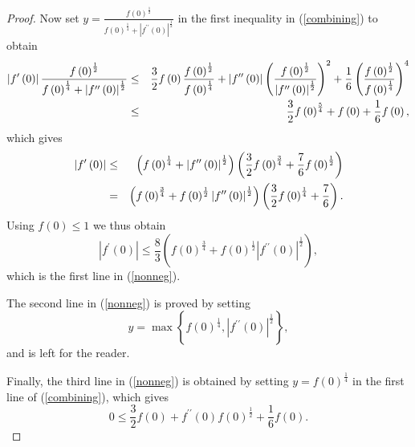 \documentclass{amsart}
\theoremstyle{plain}
\numberwithin{equation}{section}
\begin{document}
\begin{proof}
Now set $y=\frac{f\left( 0\right) ^{\frac{1}{2}}}{f\left( 0\right) ^{\frac{1%
}{4}}+\left\vert f^{\prime \prime }\left( 0\right) \right\vert ^{\frac{1}{2}}%
}$ in the first inequality in (\ref{combining}) to obtain%
\begin{eqnarray*}
\left\vert f^{\prime }\left( 0\right) \right\vert \frac{f\left( 0\right) ^{%
\frac{1}{2}}}{f\left( 0\right) ^{\frac{1}{4}}+\left\vert f^{\prime \prime
}\left( 0\right) \right\vert ^{\frac{1}{2}}} &\leq &\frac{3}{2}f\left(
0\right) \frac{f\left( 0\right) ^{\frac{1}{2}}}{f\left( 0\right) ^{\frac{1}{4%
}}}+\left\vert f^{\prime \prime }\left( 0\right) \right\vert \left( \frac{%
f\left( 0\right) ^{\frac{1}{2}}}{\left\vert f^{\prime \prime }\left(
0\right) \right\vert ^{\frac{1}{2}}}\right) ^{2}+\frac{1}{6}\left( \frac{%
f\left( 0\right) ^{\frac{1}{2}}}{f\left( 0\right) ^{\frac{1}{4}}}\right) ^{4}
\\
&\leq &\frac{3}{2}f\left( 0\right) ^{\frac{5}{4}}+f\left( 0\right) +\frac{1}{%
6}f\left( 0\right) ,
\end{eqnarray*}%
which gives%
\begin{eqnarray*}
\left\vert f^{\prime }\left( 0\right) \right\vert &\leq &\left( f\left(
0\right) ^{\frac{1}{4}}+\left\vert f^{\prime \prime }\left( 0\right)
\right\vert ^{\frac{1}{2}}\right) \left( \frac{3}{2}f\left( 0\right) ^{\frac{%
3}{4}}+\frac{7}{6}f\left( 0\right) ^{\frac{1}{2}}\right) \\
&=&\left( f\left( 0\right) ^{\frac{3}{4}}+f\left( 0\right) ^{\frac{1}{2}%
}\left\vert f^{\prime \prime }\left( 0\right) \right\vert ^{\frac{1}{2}%
}\right) \left( \frac{3}{2}f\left( 0\right) ^{\frac{1}{4}}+\frac{7}{6}%
\right) .
\end{eqnarray*}%
Using $f\left( 0\right) \leq 1$ we thus obtain 
\begin{equation*}
\left\vert f^{\prime }\left( 0\right) \right\vert \leq \frac{8}{3}\left(
f\left( 0\right) ^{\frac{3}{4}}+f\left( 0\right) ^{\frac{1}{2}}\left\vert
f^{\prime \prime }\left( 0\right) \right\vert ^{\frac{1}{2}}\right) ,
\end{equation*}%
which is the first line in (\ref{nonneg}).

The second line in (\ref{nonneg}) is proved by setting%
\begin{equation*}
y=\max \left\{ f\left( 0\right) ^{\frac{1}{4}},\left\vert f^{\prime \prime
}\left( 0\right) \right\vert ^{\frac{1}{2}}\right\} ,
\end{equation*}%
and is left for the reader.

Finally, the third line in (\ref{nonneg}) is obtained by setting $y=f\left(
0\right) ^{\frac{1}{4}}$ in the first line of (\ref{combining}), which gives%
\begin{equation*}
0\leq \frac{3}{2}f\left( 0\right) +f^{\prime \prime }\left( 0\right) f\left(
0\right) ^{\frac{1}{2}}+\frac{1}{6}f\left( 0\right) .
\end{equation*}
\end{proof}
\end{document}
